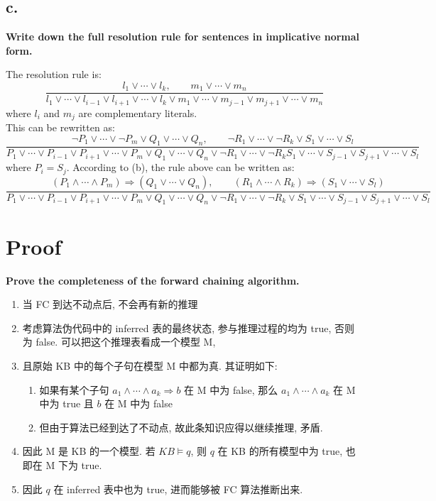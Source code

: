 \documentclass[UTF8]{article}
\newcommand{\jumpLine} {\hspace*{\fill} \par}
\begin{document}
\subsection*{c.}
\noindent \textbf{Write down the full resolution rule for sentences in implicative normal form.}\\
\jumpLine\noindent 
The resolution rule is:
$$\frac{l_1\lor\cdots\lor l_k,\qquad m_1\lor\cdots\lor m_n}{l_1\lor\cdots\lor l_{i-1}\lor l_{i+1}\lor\cdots\lor l_k\lor m_1\lor\cdots\lor m_{j-1}\lor m_{j+1} \lor\cdots\lor m_n}$$
where $l_i$ and $m_j$ are complementary literals.\\
This can be rewritten as:
$$\frac{\lnot P_1\lor\cdots\lor\lnot P_m\lor Q_1\lor\cdots\lor Q_n,\qquad \lnot R_1\lor\cdots\lor\lnot R_k\lor S_1\lor\cdots\lor S_l}{P_1\lor\cdots\lor P_{i-1}\lor P_{i+1}\lor\cdots\lor P_m\lor Q_1\lor\cdots\lor Q_n\lor \lnot R_1\lor\cdots\lor\lnot R_k S_1\lor\cdots\lor S_{j-1}\lor S_{j+1} \lor\cdots\lor S_l}$$
where $P_i=S_j$. According to (b), the rule above can be written as:
$$\frac{(P_1\land\cdots\land P_m)\Rightarrow (Q_1\lor\cdots\lor Q_n),\qquad (R_1\land\cdots\land R_k)\Rightarrow (S_1\lor\cdots\lor S_l)}{P_1\lor\cdots\lor P_{i-1}\lor P_{i+1}\lor\cdots\lor P_m\lor Q_1\lor\cdots\lor Q_n\lor \lnot R_1\lor\cdots\lor\lnot R_k\lor  S_1\lor\cdots\lor S_{j-1}\lor S_{j+1} \lor\cdots\lor S_l}$$



\section*{Proof}
\noindent \textbf{Prove the completeness of the forward chaining algorithm.}\\
\jumpLine\noindent 
\begin{enumerate}[label=\arabic*. ]
	\item 当 FC 到达不动点后, 不会再有新的推理
	\item 考虑算法伪代码中的 inferred 表的最终状态, 参与推理过程的均为 true, 否则为 false. 可以把这个推理表看成一个模型 M, 
	\item 且原始 KB 中的每个子句在模型 M 中都为真. 其证明如下:
	\begin{enumerate}[label=(\arabic*). ]
		\item 如果有某个子句 $a_1\land\cdots\land a_k\Rightarrow b$ 在 M 中为 false, 那么 $a_1\land\cdots\land a_k$ 在 M 中为 true 且 $b$ 在 M 中为 false
		\item 但由于算法已经到达了不动点, 故此条知识应得以继续推理, 矛盾.
	\end{enumerate}
	\item 因此 M 是 KB 的一个模型. 若 $KB\vDash q$, 则 $q$ 在 KB 的所有模型中为 true, 也即在 M 下为 true.
	\item 因此 $q$ 在 inferred 表中也为 true, 进而能够被 FC 算法推断出来.
\end{enumerate}
\end{document}
